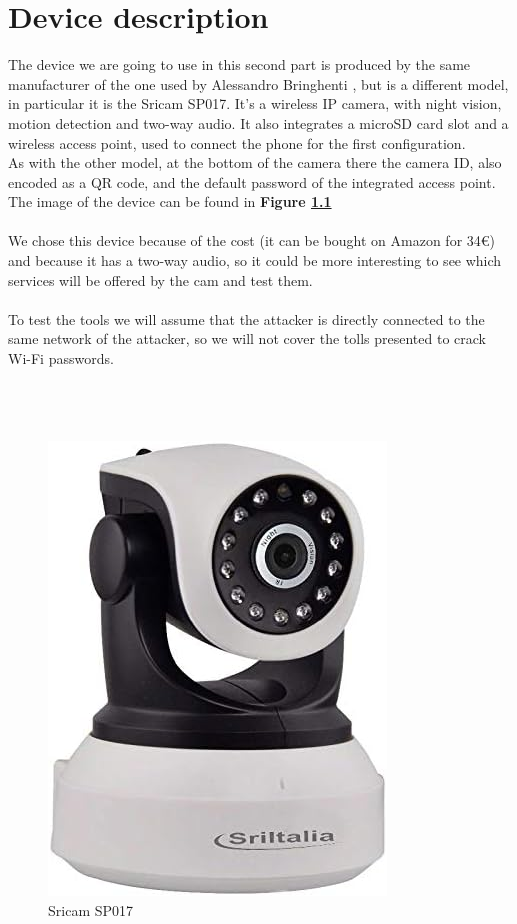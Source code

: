 \chapter{Device description}
The device we are going to use in this second part is produced by the same manufacturer
of the one used by Alessandro Bringhenti \cite{previouswork}, but is a different model, in particular
it is the Sricam SP017. It's a wireless IP camera, with night vision, motion detection
and two-way audio. It also integrates a microSD card slot and a wireless
access point, used to connect the phone for the first configuration.\\
As with the other model, at the bottom of the camera there the camera ID, also
encoded as a QR code, and the default password of the integrated access point.\\
The image of the device can be found in \textbf{Figure \ref{fig:sp017}}\\\\
We chose this device because of the cost (it can be bought on Amazon for 34€) and
because it has a two-way audio, so it could be more interesting to see which services
will be offered by the cam and test them.\\\\
To test the tools we will assume that the attacker is directly connected to the
same network of the attacker, so we will not cover the tolls presented to 
crack Wi-Fi passwords.\\\\\\\\
\begin{figure}[h]
    \centering
    \includegraphics[scale=0.5]{cam.jpg}
    \caption{Sricam SP017}
    \label{fig:sp017}
\end{figure}
\newpage